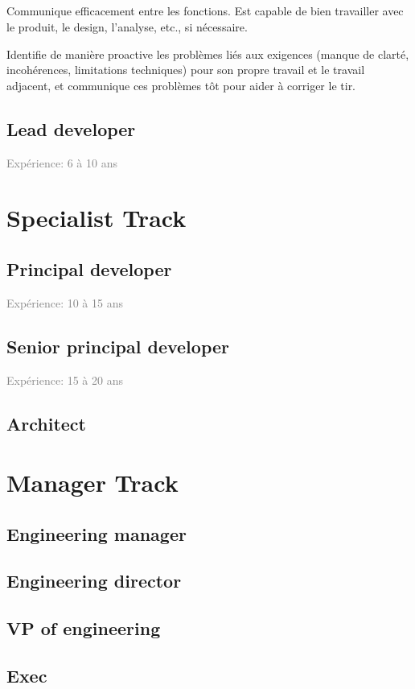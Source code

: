 \documentclass[a4paper, french, openany, 12pt]{book}
\newcommand\cha{\textcolor{RawSienna}{\textbf{\bsc{Cha}}}}
\newcommand\xp[1]{\textcolor{Gray}{Expérience: {#1} ans}}
\begin{document}
\subsubsection*{\cha}

Communique efficacement entre les fonctions.
Est capable de bien travailler avec le produit, le design, l'analyse, etc., si nécessaire.

Identifie de manière proactive les problèmes liés aux exigences (manque de clarté, incohérences, limitations techniques)
pour son propre travail et le travail adjacent, et communique ces problèmes tôt pour aider à corriger le tir.

\chapter{Lead developer}

\xp{6 à 10}

\part{Specialist Track}

\chapter{Principal developer}

\xp{10 à 15}

\chapter{Senior principal developer}

\xp{15 à 20}

\chapter{Architect}

\part{Manager Track}

\chapter{Engineering manager}

\chapter{Engineering director}

\chapter{VP of engineering}

\chapter{Exec}

\backmatter

\tableofcontents
\end{document}
